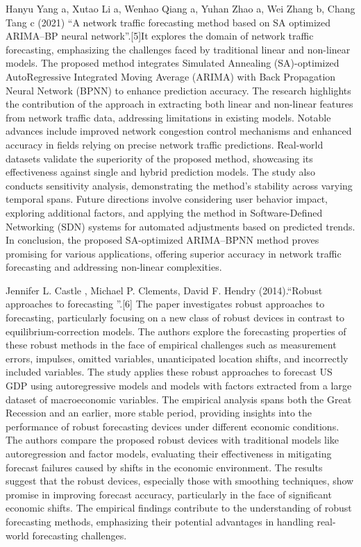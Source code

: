         Hanyu Yang a, Xutao Li a, Wenhao Qiang a, Yuhan Zhao a, Wei Zhang b, Chang Tang c (2021) “A network traffic forecasting method based on SA optimized ARIMA–BP neural network”.[5]It explores the domain of network traffic forecasting, emphasizing the challenges faced by traditional linear and non-linear models. The proposed method integrates Simulated Annealing (SA)-optimized AutoRegressive Integrated Moving Average (ARIMA) with Back Propagation Neural Network (BPNN) to enhance prediction accuracy. The research highlights the contribution of the approach in extracting both linear and non-linear features from network traffic data, addressing limitations in existing models. Notable advances include improved network congestion control mechanisms and enhanced accuracy in fields relying on precise network traffic predictions. Real-world datasets validate the superiority of the proposed method, showcasing its effectiveness against single and hybrid prediction models. The study also conducts sensitivity analysis, demonstrating the method's stability across varying temporal spans. Future directions involve considering user behavior impact, exploring additional factors, and applying the method in Software-Defined Networking (SDN) systems for automated adjustments based on predicted trends. In conclusion, the proposed SA-optimized ARIMA–BPNN method proves promising for various applications, offering superior accuracy in network traffic forecasting and addressing non-linear complexities.
        
        Jennifer L. Castle , Michael P. Clements, David F. Hendry (2014).“Robust approaches to forecasting ”.[6] The paper investigates robust approaches to forecasting, particularly focusing on a new class of robust devices in contrast to equilibrium-correction models. The authors explore the forecasting properties of these robust methods in the face of empirical challenges such as measurement errors, impulses, omitted variables, unanticipated location shifts, and incorrectly included variables. The study applies these robust approaches to forecast US GDP using autoregressive models and models with factors extracted from a large dataset of macroeconomic variables. The empirical analysis spans both the Great Recession and an earlier, more stable period, providing insights into the performance of robust forecasting devices under different economic conditions. The authors compare the proposed robust devices with traditional models like autoregression and factor models, evaluating their effectiveness in mitigating forecast failures caused by shifts in the economic environment. The results suggest that the robust devices, especially those with smoothing techniques, show promise in improving forecast accuracy, particularly in the face of significant economic shifts. The empirical findings contribute to the understanding of robust forecasting methods, emphasizing their potential advantages in handling real-world forecasting challenges.
        

